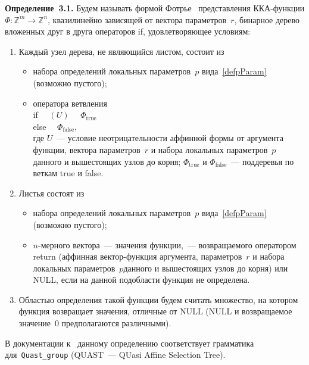 \begin{multicols}{2}
\noindent
\textbf{Определение~3.1.}
Будем называть формой Фотрье~\cite{Feautrier2} представления
ККА-функции $\Phi:\mathbb{Z}^m\to\mathbb{Z}^n$, квазилинейно
зависящей от вектора параметров~$r$, бинарное дерево вложенных друг
в друга операторов if, удовлетворяющее условиям:
\begin{enumerate}
\item Каждый узел дерева, не являющийся листом, состоит из
    \begin{itemize}
    \item набора определений локальных па\-ра\-мет\-ров~$p$ вида~\eqref{defpParam} (возможно пустого);
    \item оператора ветвления \\
    if \ \ $(U)$ \ \  $\Phi_{\mathrm{true}}$\\
    else \ \  $\Phi_{\mathrm{false}}$,\\
    где $U$~--- условие неотрицательности аффинной формы от аргумента функции, вектора 
    па\-ра\-мет\-ров~$r$ и набора локальных па\-ра\-мет\-ров~$p$ данного и 
    вышестоящих узлов до корня; $\Phi_{\mathrm{true}}$ и $\Phi_{\mathrm{false}}$~--- 
    поддеревья по веткам true и false.\\[-15pt]
    \end{itemize}
\item Листья состоят из
    \begin{itemize}
    \item набора определений локальных па\-ра\-мет\-ров~$p$ вида~\eqref{defpParam} 
    (возможно пус\-то\-го);\\[-15pt]
    \item $n$-мер\-но\-го вектора~--- значения функции,~--- 
    возвращаемого оператором return (аффинная век\-тор\--функ\-ция аргумента,  
    па\-ра\-мет\-ров~$r$ и набора локальных па\-ра\-мет\-ров~$p$\linebreak данного и вышестоящих узлов 
    до корня) или NULL, если на данной подобласти функция не определена.\\[-15pt]
    \end{itemize}

\item Областью определения такой функции будем считать множество, на котором функция 
возвращает значения, отличные от NULL (NULL и возвращаемое значение~0 предполагаются 
различными).
\end{enumerate}

\smallskip

В документации к~\cite{Feautrier3} данному определению соответствует грамматика 
для~\verb+Quast_group+ (QUAST~--- QUasi Affine Selection Tree).


\end{multicols}
